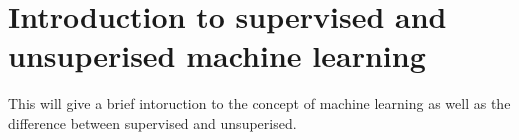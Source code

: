 \chapter{Introduction to supervised and unsuperised machine learning}\label{chap:Intro ML}

This will give a brief intoruction to the concept of machine learning as well as the difference between supervised and unsuperised.

